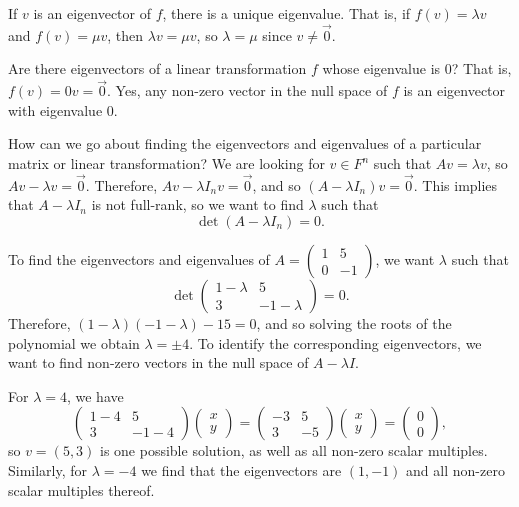 \begin{rmk}
    If $v$ is an eigenvector of $f$, there is a unique eigenvalue. That is, if $f(v) = \lambda v$ and $f(v) = \mu v$, then $\lambda v = \mu v$, so $\lambda = \mu$ since $v \neq \vec{0}$.
\end{rmk}

\begin{rmk}
    Are there eigenvectors of a linear transformation $f$ whose eigenvalue is $0$? That is, $f(v) = 0v = \vec{0}$. Yes, any non-zero vector in the null space of $f$ is an eigenvector with eigenvalue $0$.
\end{rmk}

How can we go about finding the eigenvectors and eigenvalues of a particular matrix or linear transformation? We are looking for $v \in F^n$ such that $Av = \lambda v$, so $Av - \lambda v = \vec{0}$. Therefore, $Av - \lambda I_n v = \vec{0}$, and so $(A - \lambda I_n)v = \vec{0}$. This implies that $A - \lambda I_n$ is not full-rank, so we want to find $\lambda$ such that
\[\det(A - \lambda I_n) = 0.\]

\begin{exmp}
    To find the eigenvectors and eigenvalues of $A = \begin{pmatrix}
        1 & 5 \\ 0 & -1
    \end{pmatrix}$, we want $\lambda$ such that
    \[\det \begin{pmatrix}
        1-\lambda & 5 \\ 3 & -1-\lambda
    \end{pmatrix} = 0.\]
    Therefore, $(1-\lambda)(-1-\lambda) - 15 = 0$, and so solving the roots of the polynomial we obtain $\lambda = \pm 4$. To identify the corresponding eigenvectors, we want to find non-zero vectors in the null space of $A - \lambda I$.

    For $\lambda = 4$, we have
    \[\begin{pmatrix}
        1-4 & 5 \\ 3 & -1 - 4
    \end{pmatrix}\begin{pmatrix}
        x \\ y
    \end{pmatrix} = \begin{pmatrix}
        -3 & 5 \\ 3 & -5
    \end{pmatrix}\begin{pmatrix}
        x \\ y
    \end{pmatrix} = \begin{pmatrix}
        0 \\ 0
    \end{pmatrix},\] so $v = (5, 3)$ is one possible solution, as well as all non-zero scalar multiples. Similarly, for $\lambda = -4$ we find that the eigenvectors are $(1, -1)$ and all non-zero scalar multiples thereof.
\end{exmp}

